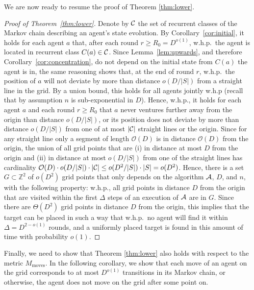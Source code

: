 \documentclass[11pt]{article}
\newcommand{\Z}{\mathbb{Z}}
\newcommand{\BO}{\mathcal{O}}
\begin{document}
We are now ready to resume the proof of Theorem \ref{thm:lower}.
\begin{proof}[Proof of Theorem~\ref{thm:lower}]
Denote by ${\cal C}$ the set of recurrent classes of the Markov chain describing an agent's state evolution. By Corollary~\ref{cor:initial}, it holds for each agent $a$ that, after each round $r \geq R_0=D^{o(1)}$, w.h.p.\ the agent is located in recurrent class $C(a)\in {\cal C}$. Since Lemma~\ref{lem:upwards}, and therefore Corollary~\ref{cor:concentration}, do not depend on the initial state from $C(a)$ the agent is in, the same reasoning shows that, at the end of round $r$, w.h.p.\ the position of $a$ will not deviate by more than distance $o(D/|S|)$ from a straight line in the grid. By a union bound, this holds for all agents jointly w.h.p (recall that by assumption $n$ is sub-exponential in $D$). Hence, w.h.p., it holds for each agent $a$ and each round $r \geq R_0$ that $a$ never ventures further away from the origin than distance $o(D/|S|)$, or its position does not deviate by more than distance $o(D/|S|)$ from one of at most $|{\cal C}|$ straight lines or the origin. Since for any straight line only a segment of length $\BO(D)$ is in distance $\BO(D)$ from the origin, the union of all grid points that are (i) in distance at most $D$ from the origin and (ii) in distance at most $o(D/|S|)$ from one of the straight lines has cardinality $\BO(D)\cdot o(D/|S|)\cdot |{\cal C}|\leq o(D^2/|S|)\cdot |S|= o(D^2)$. Hence, there is a set $G\subset \Z^2$ of $o(D^2)$ grid points that only depends on the algorithm ${\cal A}$, $D$, and $n$, with the following property: w.h.p., all grid points in distance $D$ from the origin that are visited within the first $\Delta$ steps of an execution of ${\cal A}$ are in $G$. Since there are $\Theta(D^2)$ grid points in distance $D$ from the origin, this implies that the target can be placed in such a way that w.h.p.\ no agent will find it within $\Delta=D^{2-o(1)}$ rounds, and a uniformly placed target is found in this amount of time with probability $o(1)$.
\end{proof}

Finally, we need to show that Theorem \ref{thm:lower} also holds with respect to the metric $M_{\text{moves}}$. In the following corollary, we show that each move of an agent on the grid corresponds to at most $D^{o(1)}$ transitions in its Markov chain, or otherwise, the agent does not move on the grid after some point on. 
\end{document}
